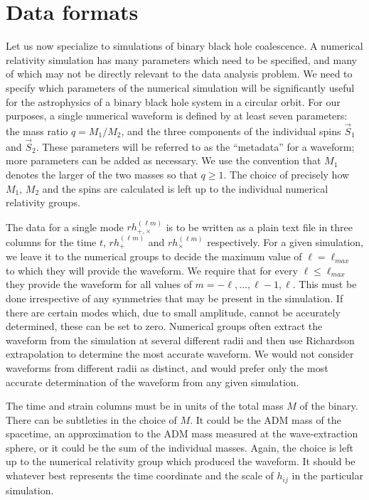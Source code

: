 \documentclass[10pt]{ligodcc}
\begin{document}
\section{Data formats}
\label{sec:format}


Let us now specialize to simulations of binary black hole coalescence.
A numerical relativity simulation has many parameters which need to be
specified, and many of which may not be directly relevant to the data
analysis problem.  We need to specify which parameters of the numerical
simulation will be significantly useful for the astrophysics of a binary
black hole system in a circular orbit.  For our purposes, a single
numerical waveform is defined by at least seven parameters: the mass
ratio $q = M_1/M_2$, and the three components of the individual spins
$\vec{S}_1$ and $\vec{S}_2$.  These parameters will be referred to as
the ``metadata'' for a waveform; more parameters can be added as
necessary. We use the convention that $M_1$ denotes the larger of the
two masses so that $q\geq 1$.  The choice of precisely how $M_1$, $M_2$
and the spins are calculated is left up to the individual numerical
relativity groups.  

The data for a single mode $rh_{+,\times}^{(\ell m)}$ is to be written
as a plain text file in three columns for the time $t$, $rh_+^{(\ell
m)}$ and $rh_\times^{(\ell m)}$ respectively.  For a given simulation,
we leave it to the numerical groups to decide the maximum value of $\ell
= \ell_{max}$ to which they will provide the waveform.  We require that
for every $\ell \le \ell_{max}$ they provide the waveform for all values
of $m=-\ell,\ldots,\ell-1,\ell$.  This must be done irrespective of any
symmetries that may be present in the simulation.  If there are certain
modes which, due to small amplitude, cannot be accurately determined,
these can be set to zero.  Numerical groups often extract the waveform
from the simulation at several different radii and then use Richardson
extrapolation to determine the most accurate waveform.  We would not
consider waveforms from different radii as distinct, and would prefer
only the most accurate determination of the waveform from any given
simulation.

The time and strain columns must be in units of the total mass $M$ of
the binary.  There can be subtleties in the choice of $M$.  It could be
the ADM mass of the spacetime, an approximation to the ADM mass measured
at the wave-extraction sphere, or it could be the sum of the individual
masses.  Again, the choice is left up to the numerical relativity group
which produced the waveform.  It should be whatever best represents the
time coordinate and the scale of $h_{ij}$ in the particular simulation.
\end{document}
